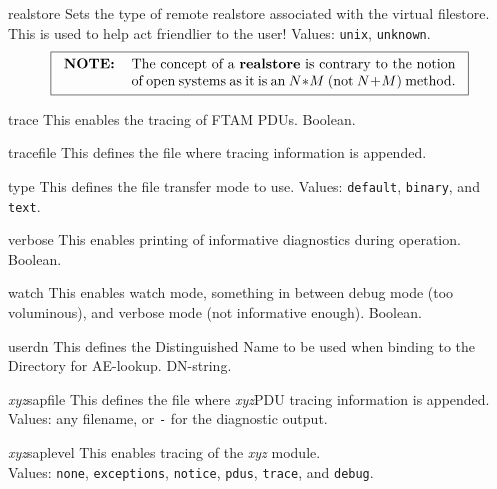 \begin{describe}
\item[realstore]
Sets the type of remote realstore associated with the virtual filestore.
This is used to help  act friendlier to the user!
Values: \verb"unix", \verb"unknown".
\[\fbox{\begin{tabular}{lp{0.67\textwidth}}
\bf NOTE:&	The concept of a {\bf realstore\/} is contrary to the notion of
		open systems as it is an $N*M$ (not $N+M\/$) method.
\end{tabular}}\]

\item[trace]
This enables the tracing of FTAM PDUs.  Boolean.

\item[tracefile]
This defines the file where tracing information is appended.

\item[type]
This defines the file transfer mode to use.
Values: \verb"default", \verb"binary", and \verb"text".

\item[verbose]
This enables printing of informative diagnostics during operation.  Boolean.

\item[watch]
This enables watch mode,
something in between debug mode (too voluminous),
and verbose mode (not informative enough).  Boolean.

\item[userdn]
This defines the Distinguished Name to be used when binding to the Directory
for AE-lookup.
DN-string.

\item[{\em xyz\/}sapfile]
This defines the file where {\em xyz\/}PDU tracing information is appended.
Values: any filename, or \verb"-" for the diagnostic output.

\item[{\em xyz\/}saplevel]
This enables tracing of the {\em xyz\/} module.\\
Values: \verb"none", \verb"exceptions", \verb"notice", \verb"pdus",
\verb"trace", and \verb"debug".
\end{describe}

